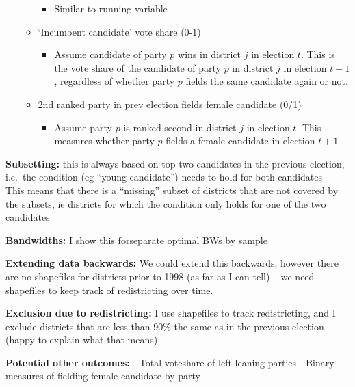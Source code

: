 \documentclass[
  letterpaper,
  DIV=11,
  numbers=noendperiod]{scrartcl}
\providecommand{\tightlist}{%
  \setlength{\itemsep}{0pt}\setlength{\parskip}{0pt}}\usepackage{longtable,booktabs,array}
\begin{document}
\begin{itemize}
\begin{itemize}
    \begin{itemize}
    \tightlist
    \item
      Similar to running variable
    \end{itemize}
  \item
    `Incumbent candidate' vote share (0-1)

    \begin{itemize}
    \tightlist
    \item
      Assume candidate of party \(p\) wins in district \(j\) in election
      \(t\). This is the vote share of the candidate of party \(p\) in
      district \(j\) in election \(t+1\), regardless of whether party
      \(p\) fields the same candidate again or not.
    \end{itemize}
  \item
    2nd ranked party in prev election fields female candidate (0/1)

    \begin{itemize}
    \tightlist
    \item
      Assume party \(p\) is ranked second in district \(j\) in election
      \(t\). This measures whether party \(p\) fields a female candidate
      in election \(t+1\)
    \end{itemize}
  \end{itemize}
\end{itemize}

\textbf{Subsetting:} this is always based on top two candidates in the
previous election, i.e.~the condition (eg ``young candidate'') needs to
hold for both candidates - This means that there is a ``missing'' subset
of districts that are not covered by the subsets, ie districts for which
the condition only holds for one of the two candidates

\textbf{Bandwidths:} I show this forseparate optimal BWs by sample

\textbf{Extending data backwards:} We could extend this backwards,
however there are no shapefiles for districts prior to 1998 (as far as I
can tell) -- we need shapefiles to keep track of redistricting over
time.

\textbf{Exclusion due to redistricting:} I use shapefiles to track
redistricting, and I exclude districts that are less than 90\% the same
as in the previous election (happy to explain what that means)

\textbf{Potential other outcomes:} - Total voteshare of left-leaning
parties - Binary measures of fielding female candidate by party
\end{document}
